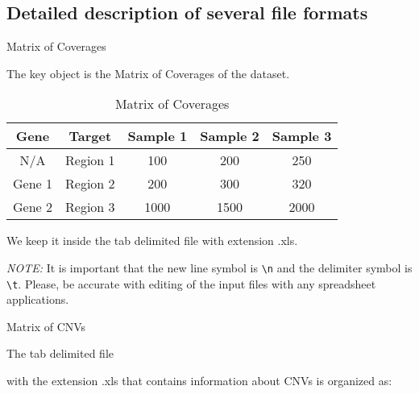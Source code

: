 \documentclass{article}
\begin{document}
\subsection{Detailed description of several file formats}

{\Large Matrix of Coverages}

The key object is the Matrix of Coverages of the dataset.


\begin{table}[h]
\centering
\caption{Matrix of Coverages}
\label{matrixOfCoverages}
\begin{tabular}{|c|c|c|c|c|}
\hline
Gene                         & Target                        & Sample 1                  & Sample 2                  & Sample 3 \\ \hline
N/A                          & Region 1                      & 100                       & 200                       & 250      \\ \hline
Gene 1                       & Region 2                      & 200                       & 300                       & 320      \\ \hline
\multicolumn{1}{|l|}{Gene 2} & Region 3 & 1000 & 1500 &   2000       \\ \hline
\end{tabular}
\end{table}

We keep it inside the tab delimited file with extension .xls.

{\it NOTE:} It is important that the new line symbol is \texttt{\textbackslash n} and the delimiter symbol is \texttt{\textbackslash t}. Please, be accurate with editing of the input files with any spreadsheet applications.

\hfill \break


{\Large Matrix of CNVs}

\hypertarget{fileWithCNVs}{The tab delimited file} with the extension .xls that contains information about CNVs is organized as:
\end{document}

